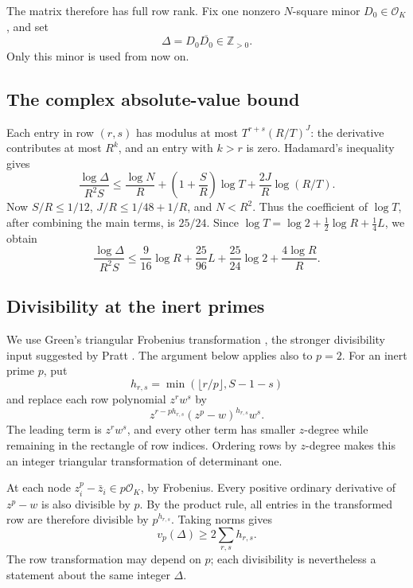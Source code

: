 \documentclass[11pt]{article}
\newcommand{\Z}{\mathbb Z}
\newcommand{\OK}{\mathcal O_K}
\begin{document}
The matrix therefore has full row rank. Fix one nonzero \(N\)-square
minor \(D_0\in\OK\), and set
\[
 \Delta=D_0\overline{D_0}\in\Z_{>0}.
\]
Only this minor is used from now on.

\subsection{The complex absolute-value bound}

Each entry in row \((r,s)\) has modulus at most
\(T^{r+s}(R/T)^J\): the derivative contributes at most \(R^k\),
and an entry with \(k>r\) is zero. Hadamard's inequality gives
\[
 \frac{\log\Delta}{R^2S}
 \le\frac{\log N}{R}+\left(1+\frac SR\right)\log T
                           +\frac{2J}{R}\log(R/T).
\]
Now \(S/R\le1/12\), \(J/R\le1/48+1/R\), and \(N<R^2\).
Thus the coefficient of \(\log T\), after combining the main
terms, is \(25/24\). Since
\(\log T=\log2+\tfrac12\log R+\tfrac14L\), we obtain
\begin{equation}\label{upper-det}
 \frac{\log\Delta}{R^2S}
 \le\frac9{16}\log R+\frac{25}{96}L
       +\frac{25}{24}\log2+\frac{4\log R}{R}.
\end{equation}

\subsection{Divisibility at the inert primes}

We use Green's triangular Frobenius transformation
\cite[Lemma~5.1]{green}, the stronger divisibility input suggested
by Pratt \cite{pratt}. The argument below applies also to \(p=2\).
For an inert prime \(p\), put
\[
 h_{r,s}=\min(\lfloor r/p\rfloor,S-1-s)
\]
and replace each row polynomial \(z^rw^s\) by
\[
 z^{r-ph_{r,s}}(z^p-w)^{h_{r,s}}w^s.
\]
The leading term is \(z^rw^s\), and every other term has smaller
\(z\)-degree while remaining in the rectangle of row indices.
Ordering rows by \(z\)-degree makes this an integer triangular
transformation of determinant one.

At each node \(z_i^p-\bar z_i\in p\OK\), by Frobenius. Every
positive ordinary derivative of \(z^p-w\) is also divisible by
\(p\). By the product rule, all entries in the transformed row
are therefore divisible by \(p^{h_{r,s}}\). Taking norms gives
\begin{equation}\label{valuation}
 v_p(\Delta)\ge2\sum_{r,s}h_{r,s}.
\end{equation}
The row transformation may depend on \(p\); each divisibility is
nevertheless a statement about the same integer \(\Delta\).
\end{document}
